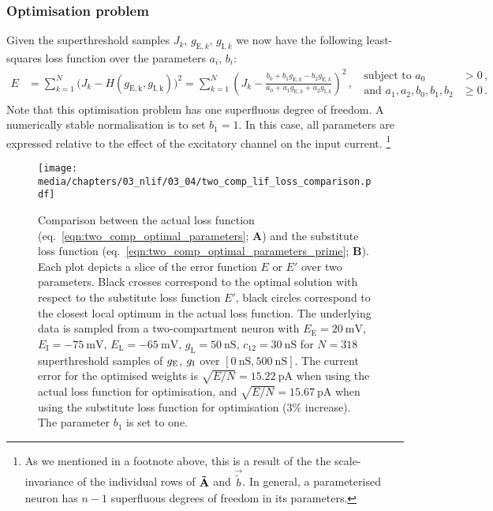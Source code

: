 \subsubsection{Optimisation problem}
Given the superthreshold samples $J_k$, $g_{\mathrm{E}, k}$, $g_{\mathrm{I}, k}$ we now have the following least-squares loss function over the parameters $a_i$, $b_i$:
\begin{align}
	E &=
		\sum_{k = 1}^N \bigl( J_k - H(g_\mathrm{E, k}, g_\mathrm{I, k}) \bigr)^2
	= \sum_{k = 1}^N \left( \! J_k - \frac{b_0 + b_1 g_{\mathrm{E}, k} - b_2 g_{\mathrm{E}, k}}{a_0 + a_1 g_{\mathrm{E}, k} + a_2  g_{\mathrm{I}, k}} \right)^2 \,,
	\;\; \begin{aligned}\text{subject to } a_0 &> 0 \,, \\ \text{and } a_1, a_2, b_0, b_1, b_2 &\geq  0 \,.\end{aligned}
	\label{eqn:two_comp_optimal_parameters}
\end{align}
Note that this optimisation problem has one superfluous degree of freedom.
A numerically stable normalisation is to set $b_1 = 1$.
In this case, all parameters are expressed relative to the effect of the excitatory channel on the input current.%
\footnote{As we mentioned in a footnote above, this is a result of the the scale-invariance of the individual rows of $\mathbf{\tilde A}$ and $\vec{\tilde b}$. In general, a parameterised \nlif neuron has $n - 1$ superfluous degrees of freedom in its parameters.}

\begin{figure}
	\centering
	\texttt{[image: media/chapters/03\_nlif/03\_04/two\_comp\_lif\_loss\_comparison.pdf]}
	\caption[Comparison between the actual and substitute loss function.]{Comparison between the actual loss function (eq.~\ref{eqn:two_comp_optimal_parameters}; \textbf{A}) and the substitute loss function (eq.~\ref{eqn:two_comp_optimal_parameters_prime}; \textbf{B}).
	Each plot depicts a slice of the error function $E$ or $E'$ over two parameters.
	Black crosses correspond to the optimal solution with respect to the substitute loss function $E'$, black circles correspond to the closest local optimum in the actual loss function.
	The underlying data is sampled from a two-compartment neuron with  $E_\mathrm{E} = \SI{20}{\milli\volt}$, $E_\mathrm{I} = \SI{-75}{\milli\volt}$, $E_\mathrm{L} = \SI{-65}{\milli\volt}$, $g_\mathrm{L} = \SI{50}{\nano\siemens}$, $c_{12} =\SI{30}{\nano\siemens}$ for $N = 318$ superthreshold samples of $g_\mathrm{E}$, $g_\mathrm{I}$ over $[\SI{0}{\nano\siemens}, \SI{500}{\nano\siemens}]$.
	The \RMSE current error for the optimised weights is $\sqrt{E/N} = \SI{15.22}{\pico\ampere}$ when using the actual loss function for optimisation, and $\sqrt{E/N} = \SI{15.67}{\pico\ampere}$ when using the substitute loss function for optimisation ($3\%$ increase). The parameter $b_1$ is set to one.
	}
	\label{fig:two_comp_lif_loss_comparison}
\end{figure}

